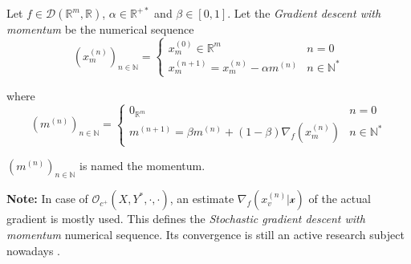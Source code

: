 \documentclass[11pt,en]{elegantpaper}
\newcommand{\Real}{\mathbb{R}}
\begin{document}
\begin{definition}
  Let $f \in \mathcal{D}(\Real^m,\Real)$, $\alpha \in \Real^{+*}$ and $\beta \in [0,1]$. Let the \textit{Gradient descent with momentum}
  be the numerical sequence \begin{equation}\label{def:stochastic_grad_descent}
    (x_m^{(n)})_{n \in \mathbb{N}} = \left\{
      \begin{array}{ll}
        x_m^{(0)} \in \Real^m & n = 0 \\
        x_m^{(n+1)} = x_m^{(n)} - \alpha m^{(n)} & n \in \mathbb{N}^*
      \end{array}
    \right.
  \end{equation} \par

  where \begin{equation*}
    (m^{(n)})_{n \in \mathbb{N}} = \left\{
      \begin{array}{ll}
        0_{\Real^m} & n = 0 \\
        m^{(n+1)} = \beta m^{(n)} + (1 - \beta) \nabla_f(x_m^{(n)}) & n \in \mathbb{N}^*
      \end{array}
    \right.
  \end{equation*} \par

  $(m^{(n)})_{n \in \mathbb{N}}$ is named the momentum.

  \textbf{Note:} In case of $\mathcal{O}_{c^+}(X,Y^*,\cdot,\cdot)$, an estimate $\nabla_f(x_v^{(n)} | \mathcal{x})$ of the actual gradient
  is mostly used. This defines the \textit{Stochastic gradient descent with momentum} numerical sequence. Its convergence is still an active
  research subject nowadays \citep{gradconv_momentum:1}.
\end{definition}

\nocite{*}

\end{document}
